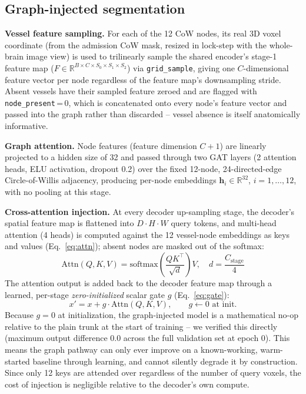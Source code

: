 \documentclass[conference]{IEEEtran}
\begin{document}
\subsection{Graph-injected segmentation}
\label{sec:gnn}

\textbf{Vessel feature sampling.} For each of the 12 CoW nodes, its real 3D voxel coordinate (from the admission CoW mask, resized in lock-step with the whole-brain image view) is used to trilinearly sample the shared encoder's stage-1 feature map ($F \in \mathbb{R}^{B\times C\times S_0\times S_1\times S_2}$) via \texttt{grid\_sample}, giving one $C$-dimensional feature vector per node regardless of the feature map's downsampling stride. Absent vessels have their sampled feature zeroed and are flagged with \texttt{node\_present}\,=\,0, which is concatenated onto every node's feature vector and passed into the graph rather than discarded -- vessel absence is itself anatomically informative.

\textbf{Graph attention.} Node features (feature dimension $C{+}1$) are linearly projected to a hidden size of 32 and passed through two GAT \cite{velickovic2018} layers (2 attention heads, ELU activation, dropout 0.2) over the fixed 12-node, 24-directed-edge Circle-of-Willis adjacency, producing per-node embeddings $\mathbf{h}_i \in \mathbb{R}^{32}$, $i=1,\dots,12$, with no pooling at this stage.

\textbf{Cross-attention injection.} At every decoder up-sampling stage, the decoder's spatial feature map is flattened into $D\!\cdot\!H\!\cdot\!W$ query tokens, and multi-head attention (4 heads) is computed against the 12 vessel-node embeddings as keys and values (Eq.~\ref{eq:attn}); absent nodes are masked out of the softmax:
\begin{equation}
\label{eq:attn}
\mathrm{Attn}(Q,K,V) = \mathrm{softmax}\!\left(\frac{QK^\top}{\sqrt{d}}\right)V, \quad d = \frac{C_{\text{stage}}}{4}
\end{equation}
The attention output is added back to the decoder feature map through a learned, per-stage \emph{zero-initialized} scalar gate $g$ (Eq.~\ref{eq:gate}):
\begin{equation}
\label{eq:gate}
x' = x + g \cdot \mathrm{Attn}(Q,K,V), \qquad g \leftarrow 0 \text{ at init.}
\end{equation}
Because $g=0$ at initialization, the graph-injected model is a mathematical no-op relative to the plain trunk at the start of training -- we verified this directly (maximum output difference 0.0 across the full validation set at epoch 0). This means the graph pathway can only ever improve on a known-working, warm-started baseline through learning, and cannot silently degrade it by construction. Since only 12 keys are attended over regardless of the number of query voxels, the cost of injection is negligible relative to the decoder's own compute.
\end{document}
